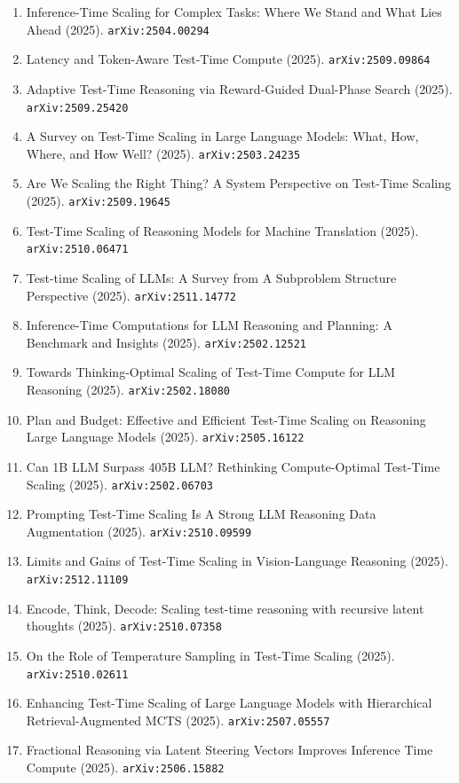 \documentclass[11pt]{article}
\begin{document}
\begin{enumerate}
  \item Inference-Time Scaling for Complex Tasks: Where We Stand and What Lies
  Ahead (2025). \texttt{arXiv:2504.00294}
  \item Latency and Token-Aware Test-Time Compute (2025). \texttt{arXiv:2509.09864}
  \item Adaptive Test-Time Reasoning via Reward-Guided Dual-Phase Search (2025). \texttt{arXiv:2509.25420}
  \item A Survey on Test-Time Scaling in Large Language Models: What, How,
  Where, and How Well? (2025). \texttt{arXiv:2503.24235}
  \item Are We Scaling the Right Thing? A System Perspective on Test-Time Scaling (2025). \texttt{arXiv:2509.19645}
  \item Test-Time Scaling of Reasoning Models for Machine Translation (2025). \texttt{arXiv:2510.06471}
  \item Test-time Scaling of LLMs: A Survey from A Subproblem Structure Perspective (2025). \texttt{arXiv:2511.14772}
  \item Inference-Time Computations for LLM Reasoning and Planning: A Benchmark
  and Insights (2025). \texttt{arXiv:2502.12521}
  \item Towards Thinking-Optimal Scaling of Test-Time Compute for LLM Reasoning (2025). \texttt{arXiv:2502.18080}
  \item Plan and Budget: Effective and Efficient Test-Time Scaling on Reasoning Large Language Models (2025). \texttt{arXiv:2505.16122}
  \item Can 1B LLM Surpass 405B LLM? Rethinking Compute-Optimal Test-Time
  Scaling (2025). \texttt{arXiv:2502.06703}
  \item Prompting Test-Time Scaling Is A Strong LLM Reasoning Data Augmentation (2025). \texttt{arXiv:2510.09599}
  \item Limits and Gains of Test-Time Scaling in Vision-Language Reasoning (2025). \texttt{arXiv:2512.11109}
  \item Encode, Think, Decode: Scaling test-time reasoning with recursive latent thoughts (2025). \texttt{arXiv:2510.07358}
  \item On the Role of Temperature Sampling in Test-Time Scaling (2025). \texttt{arXiv:2510.02611}
  \item Enhancing Test-Time Scaling of Large Language Models with Hierarchical Retrieval-Augmented MCTS (2025). \texttt{arXiv:2507.05557}
  \item Fractional Reasoning via Latent Steering Vectors Improves Inference Time Compute (2025). \texttt{arXiv:2506.15882}

\end{enumerate}
\end{document}

